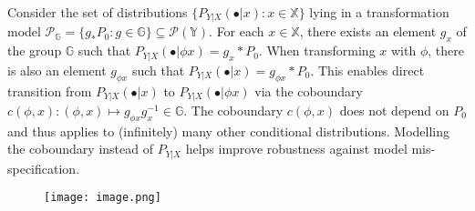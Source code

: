 \documentclass[12pt]{article}
\begin{document}
Consider the set of distributions $\{P_{Y|X}(\bullet|x): x \in \mathbb{X}\}$ lying in a transformation model $\mathcal{P}_{\mathbb{G}} = \{g_*P_0 : g \in \mathbb{G}\} \subseteq \mathcal{P}(\mathbb{Y})$. For each $x \in \mathbb{X}$, there exists an element $g_x$ of the group $\mathbb{G}$ such that $P_{Y|X}(\bullet|\phi x) = g_x*P_0$. When transforming $x$ with $\phi$, there is also an element $g_{\phi x}$ such that $P_{Y|X}(\bullet|x) = g_{\phi x}*P_0$. This enables direct transition from $P_{Y|X}(\bullet|x)$ to $P_{Y|X}(\bullet|\phi x)$ via the coboundary $c(\phi,x): (\phi,x) \mapsto g_{\phi x}g_x^{-1} \in \mathbb{G}$. The coboundary $c(\phi,x)$ does not depend on $P_0$ and thus applies to (infinitely) many other conditional distributions. Modelling the coboundary instead of $P_{Y|X}$ helps improve robustness against model mis-specification.

\begin{figure}[h]
    \centering
    \texttt{[image: image.png]}
\end{figure}
\end{document}
